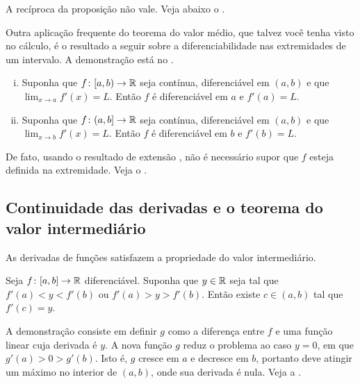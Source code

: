 A recíproca da proposição não vale. Veja abaixo o
.

\medskip

Outra aplicação frequente do teorema do valor médio, que talvez você tenha
visto no cálculo, é o resultado a seguir sobre a diferenciabilidade nas
extremidades de um intervalo. A demonstração está no
.

\begin{prop} \label{prop:endpointderivative}
\leavevmode
\begin{enumerate}[(i)]
\item
Suponha que $f \colon [a,b) \to {\mathbb{R}}$ seja contínua, diferenciável em $(a,b)$
e que $\lim_{x \to a} f'(x) = L$. Então $f$ é diferenciável em $a$ e
$f'(a) = L$.
\item
Suponha que $f \colon (a,b] \to {\mathbb{R}}$ seja contínua, diferenciável em $(a,b)$
e que $\lim_{x \to b} f'(x) = L$. Então $f$ é diferenciável em $b$ e
$f'(b) = L$.
\end{enumerate}
\end{prop}

De fato, usando o resultado de extensão , não é
necessário supor que $f$ esteja definida na extremidade. Veja o
.

\subsection{Continuidade das derivadas e o teorema do valor intermediário}

As derivadas de funções satisfazem a propriedade do valor intermediário.

\begin{thm}[Darboux] \label{thm:darboux} 
Seja $f \colon [a,b] \to {\mathbb{R}}$ diferenciável. Suponha que $y \in {\mathbb{R}}$ seja tal que $f'(a) < y < f'(b)$ ou $f'(a) > y > f'(b)$. Então existe $c \in (a,b)$ tal que $f'(c) = y$.
\end{thm}

A demonstração consiste em definir $g$ como a diferença entre $f$ e uma função linear cuja derivada é $y$. A nova função $g$ reduz o problema ao caso $y=0$, em que $g'(a) > 0 > g'(b)$. Isto é, $g$ cresce em $a$ e decresce em $b$, portanto deve atingir um máximo no interior de $(a,b)$, onde sua derivada é nula. Veja a .

\begin{myfigureht}
\caption{Ideia da demonstração do teorema de Darboux.\label{darbouxthmfig}}
\end{myfigureht}

